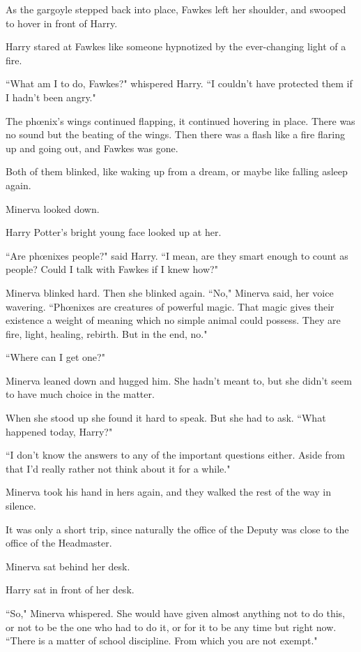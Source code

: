 As the gargoyle stepped back into place, Fawkes left her shoulder, and swooped to hover in front of Harry.

Harry stared at Fawkes like someone hypnotized by the ever-changing light of a fire.

``What am I to do, Fawkes?" whispered Harry. ``I couldn't have protected them if I hadn't been angry."

The phœnix's wings continued flapping, it continued hovering in place. There was no sound but the beating of the wings. Then there was a flash like a fire flaring up and going out, and Fawkes was gone.

Both of them blinked, like waking up from a dream, or maybe like falling asleep again.

Minerva looked down.

Harry Potter's bright young face looked up at her.

``Are phœnixes people?" said Harry. ``I mean, are they smart enough to count as people? Could I talk with Fawkes if I knew how?"

Minerva blinked hard. Then she blinked again. ``No," Minerva said, her voice wavering. ``Phœnixes are creatures of powerful magic. That magic gives their existence a weight of meaning which no simple animal could possess. They are fire, light, healing, rebirth. But in the end, no."

``Where can I get one?"

Minerva leaned down and hugged him. She hadn't meant to, but she didn't seem to have much choice in the matter.

When she stood up she found it hard to speak. But she had to ask. ``What happened today, Harry?"

``I don't know the answers to any of the important questions either. Aside from that I'd really rather not think about it for a while."

Minerva took his hand in hers again, and they walked the rest of the way in silence.

It was only a short trip, since naturally the office of the Deputy was close to the office of the Headmaster.

Minerva sat behind her desk.

Harry sat in front of her desk.

``So," Minerva whispered. She would have given almost anything not to do this, or not to be the one who had to do it, or for it to be any time but right now. ``There is a matter of school discipline. From which you are not exempt."

